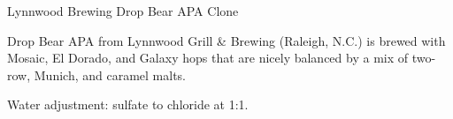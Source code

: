 \begin{recipie}{Lynnwood Brewing Drop Bear APA Clone}

\begin{aboutblock}
Drop Bear APA from Lynnwood Grill \& Brewing (Raleigh, N.C.) is brewed with Mosaic,
El Dorado, and Galaxy hops that are nicely balanced by a mix of two-row, Munich,
and caramel malts. \sourceaha
\end{aboutblock}


\begin{methodandtiming}
 
\begin{mashsteps}
\end{mashsteps}

\begin{fermentationsteps}
\end{fermentationsteps}

\begin{directions}
Water adjustment: sulfate to chloride at 1:1.
\end{directions}

\end{methodandtiming}

\pagebreak

\begin{ingredientsblock}

\begin{malts}
\end{malts}

\begin{hops}
\end{hops}


\end{ingredientsblock}

\end{recipie}

